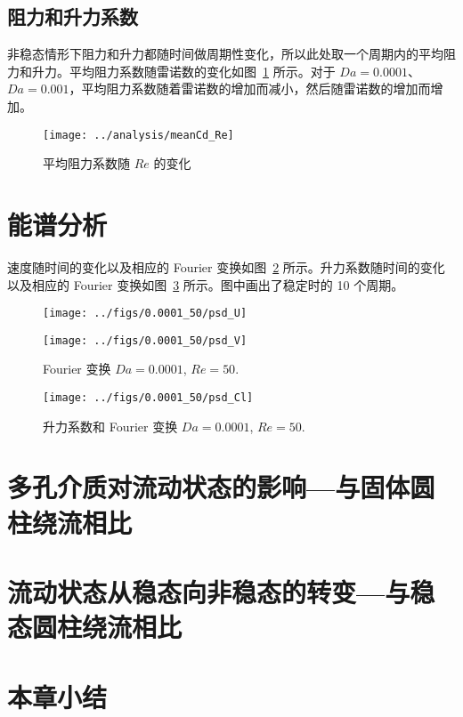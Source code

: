 \subsection{阻力和升力系数}

非稳态情形下阻力和升力都随时间做周期性变化，所以此处取一个周期内的平均阻力和升力。平均阻力系数随雷诺数的变化如图~\ref{fig: meanCd} 所示。对于 $Da=0.0001$、$Da=0.001$，平均阻力系数随着雷诺数的增加而减小，然后随雷诺数的增加而增加。

\begin{figure}
	\centering
	\texttt{[image: ../analysis/meanCd\_Re]}
	\caption{平均阻力系数随 $Re$ 的变化}
	\label{fig: meanCd}
\end{figure}

\section{能谱分析} %

速度随时间的变化以及相应的 Fourier 变换如图~\ref{fig: velocity Fourier} 所示。升力系数随时间的变化以及相应的 Fourier 变换如图~\ref{fig: Cl Fourier} 所示。图中画出了稳定时的 10 个周期。

\begin{figure}
	\centering
	\begin{minipage}{\textwidth}
		\centering
		\texttt{[image: ../figs/0.0001\_50/psd\_U]}
	\end{minipage}
	\centering
	\begin{minipage}{\textwidth}
		\centering
		\texttt{[image: ../figs/0.0001\_50/psd\_V]}
	\end{minipage}
	\caption{Fourier 变换 $Da=0.0001$, $Re=50$.}
	\label{fig: velocity Fourier}
\end{figure}

\begin{figure}
	\centering
	\texttt{[image: ../figs/0.0001\_50/psd\_Cl]}
	\caption{升力系数和 Fourier 变换 $Da=0.0001$, $Re=50$.}
	\label{fig: Cl Fourier}
\end{figure}

\section{多孔介质对流动状态的影响---与固体圆柱绕流相比}

\section{流动状态从稳态向非稳态的转变---与稳态圆柱绕流相比}

\section{本章小结}
